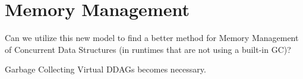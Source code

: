 \section{Memory Management}

Can we utilize this new model to find a better method for Memory Management of Concurrent Data Structures (in runtimes that are not using a built-in GC)?

Garbage Collecting Virtual DDAGs becomes necessary.